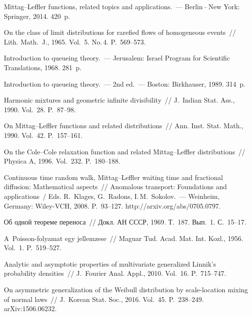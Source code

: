 \begin{multicols}{2}
{{\begin{thebibliography}{99}
Mittag--Leffler functions, related topics and applications.~--- Berlin\,--\,New York: Springer, 2014.
420~p.

 On the class of limit distributions for rarefied flows 
of homogeneous events~// Lith. Math.~J., 1965. Vol.~5. No.\,4. P.~569--573.

 Introduction to queueing theory.~--- 
Jerusalem: Israel Program for Scientific Translations, 1968. 281~p.

 Introduction to queueing theory.~--- 2nd ed.~--- 
Boston: Birkhauser, 1989. 314~p.

 Harmonic mixtures and geometric infinite divisibility~// 
J.~Indian Stat. Ass., 1990. Vol.~28. P.~87--98.

 On Mittag--Leffler functions and related distributions~// 
Ann. Inst. Stat. Math., 1990. Vol.~42. P.~157--161.

 On the Cole--Cole relaxation function and related 
Mittag--Leffler distributions~// Physica A, 1996. Vol.~232. P.~180--188.

 Continuous time random walk, Mittag--Leffler 
waiting time and fractional diffusion: Mathematical aspects~// 
 Anomalous transport: Foundations and applications~/ Eds. 
 R.~Klages, G.~Radons, I.\,M.~Sokolov.~--- Weinheim, Germany: Wiley-VCH, 2008. P.~93--127. http://arxiv.org/abs/0705.0797.

 Об одной теореме переноса~// Докл. АН СССР, 1969. Т.~187. Вып.~1. С.~15--17.

 A~Poisson-folyamat egy jellemzese~// 
Maguar Tud. Acad. Mat. Int. Kozl., 1956. Vol.~1. P.~519--527.

 Analytic and asymptotic properties of multivariate
 generalized Linnik's probability densities~// 
 J.~Fourier Anal. Appl., 2010. Vol.~16. P.~715--747.

 On asymmetric generalization 
of the Weibull distribution by scale-location mixing of normal laws~// J.~Korean 
Stat. Soc., 2016. Vol.~45. P.~238--249. arXiv:1506.06232.


\end{thebibliography}}}
\end{multicols}
